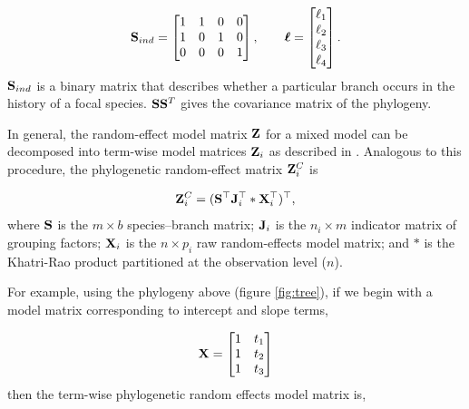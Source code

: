 \documentclass[12pt]{article}
\begin{document}
\[
{\mathbf S}_{ind} = \begin{bmatrix}
1 & 1 & 0 & 0 \\ 
1 & 0 & 1 & 0 \\ 
0 & 0 & 0 & 1
\end{bmatrix} , 
\qquad
{\boldsymbol \ell} = \begin{bmatrix}
\ell_1 \\
\ell_2 \\
\ell_3 \\
\ell_4 
\end{bmatrix} .
\]
${\mathbf S}_{ind}$ is a binary matrix that describes whether a particular branch occurs in the history of a focal species. 
${\mathbf S} {\mathbf S}^T$ gives the covariance matrix of the phylogeny. 

In general, the random-effect model matrix ${\mathbf Z}$ for a mixed model can be decomposed into term-wise model matrices ${\mathbf Z}_{i}$ as described in \citet{bates2015fitting}.
Analogous to this procedure, the phylogenetic random-effect matrix ${\mathbf Z}^{C}_{i}$ is

\begin{equation}
{\mathbf Z}^{C}_{i} = ({\mathbf S}^{\top}{\mathbf J}^{\top}_{i} \ast {\mathbf X}^{\top}_{i})^{\top}, \label{eq:ZC}
\end{equation}
where ${\mathbf S}$ is the $m \times b$ species--branch matrix; ${\mathbf J}_{i}$ is the $n_i \times m$ indicator matrix of grouping factors; ${\mathbf X}_{i}$ is the $n \times p_{i}$ raw random-effects model matrix; and $\ast$ is the Khatri-Rao product \citep{khatri1968solutions} partitioned at the observation level ($n$).

For example, using the phylogeny above (figure \ref{fig:tree}), if we begin with a model matrix corresponding to intercept and slope terms, 

\[
{\mathbf X} = \begin{bmatrix}
1 & t_1  \\ 
1 & t_2  \\ 
1 & t_3 
\end{bmatrix} 
\]
then the term-wise phylogenetic random effects model matrix is,
\end{document}
